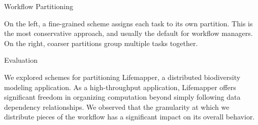 \documentclass{beamer}
\newcommand{\lm}{Lifemapper\xspace}
\begin{document}
\begin{frame}[fragile]
\begin{minipage}[t][0.97\textheight]{0.65\textwidth}
\begin{minipage}[t][0.86\textheight]{0.48\textwidth}
\begin{alertblock}{Workflow Partitioning\rule{0pt}{2.1ex}}
\vspace{32pt}

\parbox{\linewidth}{On the left, a fine-grained scheme assigns each task to its own partition.
This is the most conservative approach,
and usually the default for workflow managers.
On the right,
coarser partitions group multiple tasks together.}
\end{alertblock}

\vfill

\begin{alertblock}{Evaluation\rule{0pt}{2.1ex}}
\vspace*{16pt}
\parbox{\linewidth}{We explored schemes for partitioning \lm, a distributed biodiversity modeling application.
As a high-throughput application,
\lm offers significant freedom in organizing computation beyond simply following data dependency relationships.
We observed that the granularity at which we distribute pieces of the workflow has a significant impact on its overall behavior.

}
\end{alertblock}
\end{minipage}
\end{minipage}
\end{frame}
\end{document}
